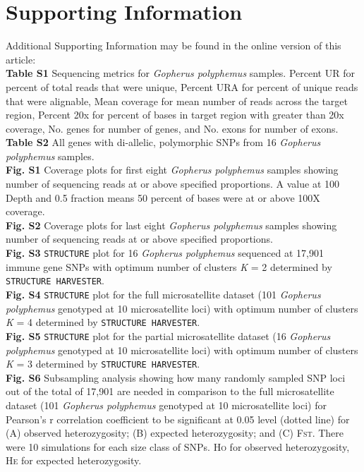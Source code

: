\documentclass[english]{article}\usepackage[]{graphicx}\usepackage[]{color}
\begin{document}
\section*{Supporting Information}
\noindent
Additional Supporting Information may be found in the online version of this article:\\
\textbf{Table S1} Sequencing metrics for \textit{Gopherus polyphemus} samples. Percent UR for percent of total reads that were unique, Percent URA for percent of unique reads that were alignable, Mean coverage for mean number of reads across the target region, Percent 20x for percent of bases in target region with greater than 20x coverage, No. genes for number of genes, and No. exons for number of exons.\\
\textbf{Table S2} All genes with di-allelic, polymorphic SNPs from 16 \textit{Gopherus polyphemus} samples.\\
\textbf{Fig. S1} Coverage plots for first eight \textit{Gopherus polyphemus} samples showing number of sequencing reads at or above specified proportions. A value at 100 Depth and 0.5 fraction means 50 percent of bases were at or above 100X coverage.\\
\textbf{Fig. S2} Coverage plots for last eight \textit{Gopherus polyphemus} samples showing number of sequencing reads at or above specified proportions.\\
\textbf{Fig. S3} \texttt{STRUCTURE} plot for 16 \textit{Gopherus polyphemus} sequenced at 17,901 immune gene SNPs with optimum number of clusters \textit{K} = 2 determined by \texttt{STRUCTURE HARVESTER}.\\
\textbf{Fig. S4} \texttt{STRUCTURE} plot for the full microsatellite dataset (101 \textit{Gopherus polyphemus} genotyped at 10 microsatellite loci) with optimum number of clusters \textit{K} = 4 determined by \texttt{STRUCTURE HARVESTER}.\\
\textbf{Fig. S5} \texttt{STRUCTURE} plot for the partial microsatellite dataset (16 \textit{Gopherus polyphemus} genotyped at 10 microsatellite loci) with optimum number of clusters \textit{K} = 3 determined by \texttt{STRUCTURE HARVESTER}.\\
\textbf{Fig. S6} Subsampling analysis showing how many randomly sampled SNP loci out of the total of 17,901 are needed in comparison to the full microsatellite dataset (101 \textit{Gopherus polyphemus} genotyped at 10 microsatellite loci) for Pearson's r correlation coefficient to be significant at 0.05 level (dotted line) for (A) observed heterozygosity; (B) expected heterozygosity; and (C) \textsc{Fst}. There were 10 simulations for each size class of SNPs. \textsc{Ho} for observed heterozygosity, \textsc{He} for expected heterozygosity.\\
\end{document}
